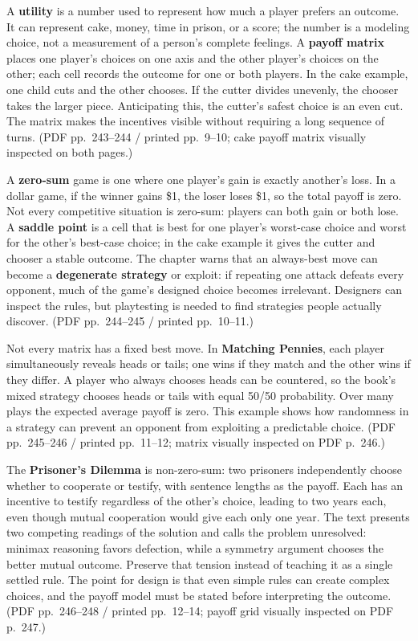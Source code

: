 A \textbf{utility} is a number used to represent how much a player prefers an outcome. It can represent cake, money, time in prison, or a score; the number is a modeling choice, not a measurement of a person's complete feelings. A \textbf{payoff matrix} places one player's choices on one axis and the other player's choices on the other; each cell records the outcome for one or both players. In the cake example, one child cuts and the other chooses. If the cutter divides unevenly, the chooser takes the larger piece. Anticipating this, the cutter's safest choice is an even cut. The matrix makes the incentives visible without requiring a long sequence of turns. (PDF pp.~243--244 / printed pp.~9--10; cake payoff matrix visually inspected on both pages.)

A \textbf{zero-sum} game is one where one player's gain is exactly another's loss. In a dollar game, if the winner gains \$1, the loser loses \$1, so the total payoff is zero. Not every competitive situation is zero-sum: players can both gain or both lose. A \textbf{saddle point} is a cell that is best for one player's worst-case choice and worst for the other's best-case choice; in the cake example it gives the cutter and chooser a stable outcome. The chapter warns that an always-best move can become a \textbf{degenerate strategy} or exploit: if repeating one attack defeats every opponent, much of the game's designed choice becomes irrelevant. Designers can inspect the rules, but playtesting is needed to find strategies people actually discover. (PDF pp.~244--245 / printed pp.~10--11.)

Not every matrix has a fixed best move. In \textbf{Matching Pennies}, each player simultaneously reveals heads or tails; one wins if they match and the other wins if they differ. A player who always chooses heads can be countered, so the book's mixed strategy chooses heads or tails with equal 50/50 probability. Over many plays the expected average payoff is zero. This example shows how randomness in a strategy can prevent an opponent from exploiting a predictable choice. (PDF pp.~245--246 / printed pp.~11--12; matrix visually inspected on PDF p.~246.)

The \textbf{Prisoner's Dilemma} is non-zero-sum: two prisoners independently choose whether to cooperate or testify, with sentence lengths as the payoff. Each has an incentive to testify regardless of the other's choice, leading to two years each, even though mutual cooperation would give each only one year. The text presents two competing readings of the solution and calls the problem unresolved: minimax reasoning favors defection, while a symmetry argument chooses the better mutual outcome. Preserve that tension instead of teaching it as a single settled rule. The point for design is that even simple rules can create complex choices, and the payoff model must be stated before interpreting the outcome. (PDF pp.~246--248 / printed pp.~12--14; payoff grid visually inspected on PDF p.~247.)

